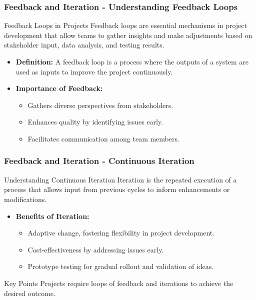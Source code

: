 \documentclass{beamer}
\begin{document}
\begin{frame}[fragile]
    \frametitle{Feedback and Iteration - Understanding Feedback Loops}
    \begin{block}{Feedback Loops in Projects}
        Feedback loops are essential mechanisms in project development that allow teams to gather insights and make adjustments based on stakeholder input, data analysis, and testing results.
    \end{block}
    \begin{itemize}
        \item \textbf{Definition:}
            A feedback loop is a process where the outputs of a system are used as inputs to improve the project continuously.
        \item \textbf{Importance of Feedback:}
            \begin{itemize}
                \item Gathers diverse perspectives from stakeholders.
                \item Enhances quality by identifying issues early.
                \item Facilitates communication among team members.
            \end{itemize}
    \end{itemize}
\end{frame}

\begin{frame}[fragile]
    \frametitle{Feedback and Iteration - Continuous Iteration}
    \begin{block}{Understanding Continuous Iteration}
        Iteration is the repeated execution of a process that allows input from previous cycles to inform enhancements or modifications.
    \end{block}
    \begin{itemize}
        \item \textbf{Benefits of Iteration:}
            \begin{itemize}
                \item Adaptive change, fostering flexibility in project development.
                \item Cost-effectiveness by addressing issues early.
                \item Prototype testing for gradual rollout and validation of ideas.
            \end{itemize}
    \end{itemize}
    \begin{block}{Key Points}
        Projects require loops of feedback and iterations to achieve the desired outcome.
    \end{block}
\end{frame}
\end{document}
